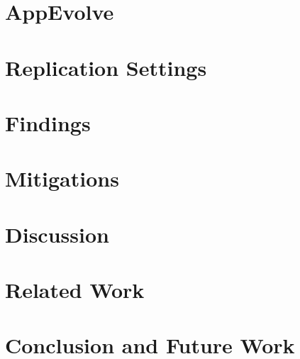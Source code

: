 \documentclass[conference]{IEEEtran}
\begin{document}
\section{AppEvolve}\label{sec:approach}


\section{Replication Settings}\label{sec:replication}


\section{Findings}\label{sec:findings}


\section{Mitigations}\label{sec:mitigations}


\section{Discussion}\label{sec:discuss}


\section{Related Work}\label{sec:related}


\section{Conclusion and Future Work}\label{sec:conclusion}



\balance



\end{document}
